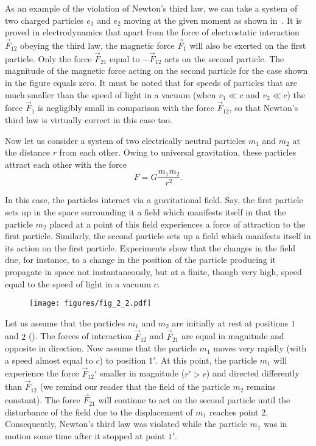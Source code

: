 As an example of the violation of Newton's third law, we can take a system of two charged particles $e_1$ and $e_2$ moving at the given moment as shown in~. It is proved in electrodynamics that apart from the force of electrostatic interaction $\vec{F}_{12}$ obeying the third law, the magnetic force $\vec{F}_1$ will also be exerted on the first particle. Only the force $\vec{F}_{21}$ equal to $-\vec{F}_{12}$ acts on the second particle. The magnitude of the magnetic force acting on the second particle for the case shown in the figure equals zero. It must be noted that for speeds of particles that are much smaller than the speed of light in a vacuum (when $v_1\ll c$ and $v_2\ll c$) the force $\vec{F}_1$ is negligibly small in comparison with the force $\vec{F}_{12}$, so that Newton's third law is virtually correct in this case too.

Now let us consider a system of two electrically neutral particles $m_1$ and $m_2$ at the distance $r$ from each other. Owing to universal gravitation, these particles attract each other with the force
\vspace*{2pt}
\begin{equation}\label{eq:2_18}
F = G\frac{m_1 m_2}{r^2}.
\end{equation}

\noindent
In this case, the particles interact via a gravitational field. Say, the first particle sets up in the space surrounding it a field which manifests itself in that the particle $m_2$ placed at a point of this field experiences a force of attraction to the first particle. Similarly, the second particle sets up a field which manifests itself in its action on the first particle. Experiments show that the changes in the field due, for instance, to a change in the position of the particle producing it propagate in space not instantaneously, but at a finite, though very high, speed equal to the speed of light in a vacuum $c$.

\begin{figure}[t]
	\begin{center}
		\texttt{[image: figures/fig\_2\_2.pdf]}
		\caption[]{}
		\label{fig:2_2}
	\end{center}
\vspace{-0.7cm}
\end{figure}

Let us assume that the particles $m_1$ and $m_2$ are initially at rest at positions $1$ and $2$ (). The forces of interaction $\vec{F}_{12}$ and $\vec{F}_{21}$ are equal in magnitude and opposite in direction. Now assume that the particle $m_1$ moves very rapidly (with a speed almost equal to $c$) to position $1'$. At this point, the particle $m_1$ will experience the force $\vec{F}_{12}'$ smaller in magnitude ($r'>r$) and directed differently than $\vec{F}_{12}$ (we remind our reader that the field of the particle $m_2$ remains constant). The force $\vec{F}_{21}$ will continue to act on the second particle until the disturbance of the field due to the displacement of $m_1$ reaches point $2$. Consequently, Newton's third law was violated while the particle $m_1$ was in motion some time after it stopped at point $1'$.

